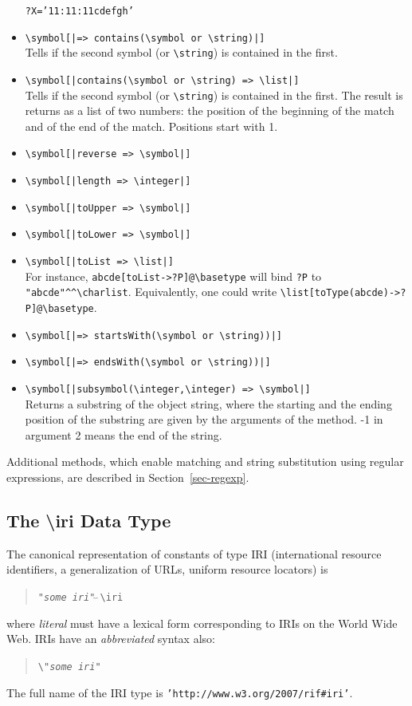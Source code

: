 \documentclass[11pt]{article}
\newcommand{\bs}{\textbackslash}
\begin{document}
\begin{itemize}
\begin{alltt}
?X = '11:11:11cdefgh'
\end{alltt}
\item {\tt \bs{}symbol[|=> contains(\bs{}symbol \textnormal{or} \bs{}string)|]}  
  \\
  Tells if the second symbol (or \texttt{\bs{}string})  is contained in the first.
\item {\tt \bs{}symbol[|contains(\bs{}symbol \textnormal{or} \bs{}string) => \bs{}list|]}  
  \\
  Tells if the second symbol (or \texttt{\bs{}string}) is contained in the first. The
  result is returns as a list of two numbers: the position of the beginning of
  the match and of the end of the match. Positions start with 1.
\item {\tt \bs{}symbol[|reverse => \bs{}symbol|]}  
\item {\tt \bs{}symbol[|length => \bs{}integer|]}  
\item {\tt \bs{}symbol[|toUpper => \bs{}symbol|]}  
\item {\tt \bs{}symbol[|toLower => \bs{}symbol|]}  
\item {\tt \bs{}symbol[|toList => \bs{}list|]} \\
  For instance, \texttt{abcde[toList->?P]@\bs{}basetype} will bind
  \texttt{?P} to \verb|"abcde"^^\charlist|.   Equivalently, one could
  write \texttt{\bs{}list[toType(abcde)->?P]@\bs{}basetype}. 
\item {\tt \bs{}symbol[|=> startsWith(\bs{}symbol  \textnormal{or} \bs{}string))|]}  
\item {\tt \bs{}symbol[|=> endsWith(\bs{}symbol  \textnormal{or} \bs{}string))|]}  
\item {\tt \bs{}symbol[|subsymbol(\bs{}integer,\bs{}integer) => \bs{}symbol|]}  
  \\
  Returns a substring of the object string, where the starting and the
  ending position of the substring are given by the arguments of the
  method. -1 in argument 2 means the end of the string.
\end{itemize}

  Additional methods, which enable matching and string substitution using
  regular expressions, are described in Section~\ref{sec-regexp}.


\subsection{The \bs{}iri Data Type}\label{sec-uri}

\index{datatype!\bs{}iri}
The canonical representation of constants of type IRI (international
resource identifiers, a generalization of URLs, uniform resource
locators) is
\begin{quote}
{\tt "\emph{some iri}"$\hat{~}\hat{~}$\bs{}iri} 
\end{quote}
where \emph{literal} must have
a lexical form corresponding to IRIs on the World Wide Web. IRIs have an
\emph{abbreviated} syntax also:
\begin{quote}
   {\tt \bs{}"\emph{some iri}"} 
\end{quote}
The full name of the IRI
type is {\tt 'http://www.w3.org/2007/rif\#iri'}. 
\end{document}
